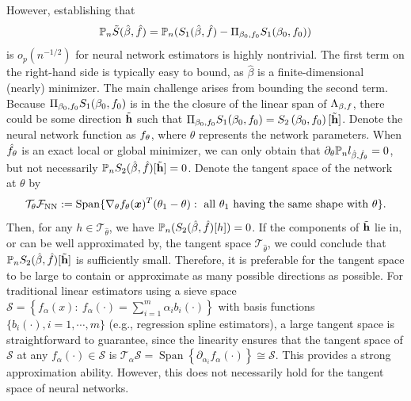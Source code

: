 However, establishing that 
$$\mathbb{P}_{n} \tilde{S}(\hat{\beta}, \hat{f})  = \mathbb{P}_{n}  (S_{1}(\hat{\beta}, \hat{f}) - \Pi_{\beta_{0}, f_{0}} S_1(\beta_{0}, f_{0}))$$ is $ o_p(n^{-1/2})$ for neural network estimators is highly nontrivial. 
The first term on the right-hand side is typically easy to bound, as $\hat{\beta}$ is a finite-dimensional (nearly) minimizer. The main challenge arises from bounding the second term. 
Because $\Pi_{\beta_{0}, f_{0}} S_1(\beta_{0}, f_{0})$ is in the the closure of the linear span of $\Lambda_{\beta,f}$, there could be some direction $\tilde{\mathbf{h}}$ such that $\Pi_{\beta_{0}, f_{0}} S_1(\beta_{0}, f_{0}) = S_{2}\left(\beta_{0}, f_{0}\right)[\tilde{\mathbf{h}} ]$. 
Denote the neural network function as $f_{\theta}$, where $\theta$ represents the network parameters. 
When $\hat{f}_{\theta}$ is an exact local or global minimizer, we can only obtain that $\partial_{\theta} \mathbb{P}_{n} l_{\hat{\beta}, \hat{f}_{\theta}} = 0$, but not necessarily $\mathbb{P}_{n} S_{2}(\hat{\beta}, \hat{f})[\tilde{\mathbf{h}} ] = 0$. 
Denote the tangent space of the network at $\theta$ by $$\mathcal{T}_{\theta}\mathcal{F}_{\text{NN}} := \operatorname{Span}\{\nabla_{\theta} f_{\theta}(\boldsymbol{x}) ^{T}  (\theta_{1} - \theta) : \text{ all } \theta_{1} \text{ having the same shape with }  \theta \}.$$ 
Then, for any $h \in \mathcal{T}_{\hat{\theta}}$, we have $\mathbb{P}_{n} (S_{2}(\hat{\beta}, \hat{f})[ h ]) = 0$. If the components of $\tilde{\mathbf{h}}$ lie in, or can be well approximated by, the tangent space $\mathcal{T}_{\hat{\theta}}$, we could conclude that $\mathbb{P}_{n} S_{2}(\hat{\beta}, \hat{f})[\tilde{\mathbf{h}} ]$ is sufficiently small. 
Therefore, it is preferable for the tangent space to be large to contain or approximate as many possible directions as possible. 
For traditional linear estimators using a sieve space $\mathcal{S}=\left\{f_\alpha(x): \ f_\alpha(\cdot)=\sum_{i=1}^m \alpha_i b_i(\cdot)\right\}$ with basis functions $\{b_i(\cdot),i=1,\cdots,m\}$ (e.g., regression spline estimators), a large tangent space is straightforward to guarantee, since
the linearity ensures that the tangent space of $\mathcal{S}$ at any $f_\alpha(\cdot)\in \mathcal{S}$ is $\mathcal{T}_\alpha\mathcal{S} = \operatorname{Span} \left\{\partial_{\alpha_i} f_\alpha(\cdot)\right\} \cong \mathcal{S}$. This provides a strong approximation ability. However, this does not necessarily hold for the tangent space of neural networks.



